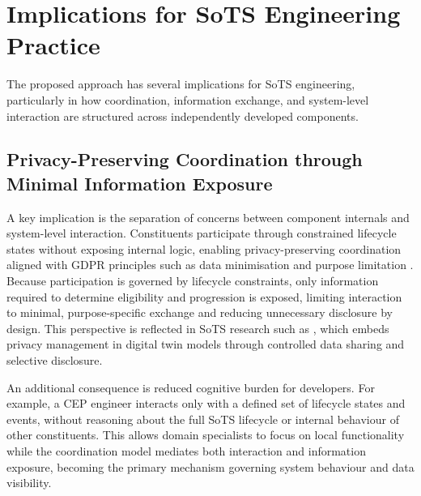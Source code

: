 


\section{Implications for SoTS Engineering Practice}\label{sec:discussion-implications}
The proposed approach has several implications for SoTS engineering, particularly in how coordination, information exchange, and system-level interaction are structured across independently developed components.

\subsection{Privacy-Preserving Coordination through Minimal Information Exposure}
A key implication is the separation of concerns between component internals and system-level interaction. Constituents participate through constrained lifecycle states without exposing internal logic, enabling privacy-preserving coordination aligned with GDPR principles such as data minimisation and purpose limitation \cite{voigt2017eu}. Because participation is governed by lifecycle constraints, only information required to determine eligibility and progression is exposed, limiting interaction to minimal, purpose-specific exchange and reducing unnecessary disclosure by design. This perspective is reflected in SoTS research such as \citet{heininger2021capturing}, which embeds privacy management in digital twin models through controlled data sharing and selective disclosure.

An additional consequence is reduced cognitive burden for developers. For example, a CEP engineer interacts only with a defined set of lifecycle states and events, without reasoning about the full SoTS lifecycle or internal behaviour of other constituents. This allows domain specialists to focus on local functionality while the coordination model mediates both interaction and information exposure, becoming the primary mechanism governing system behaviour and data visibility.

